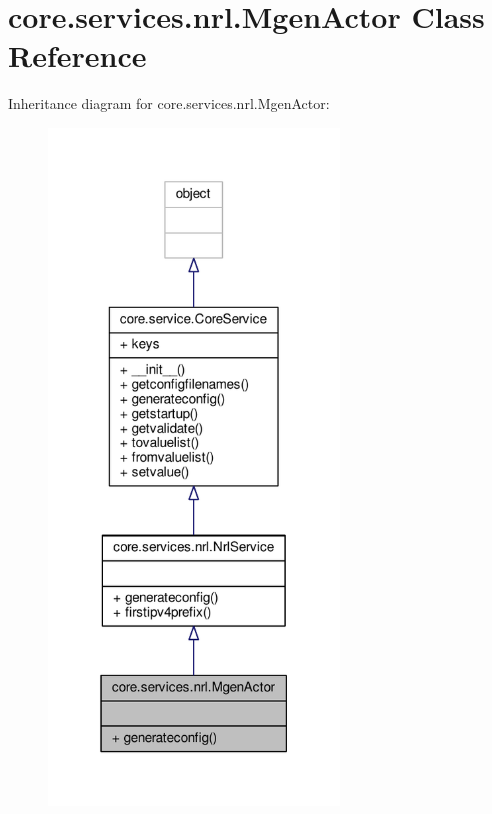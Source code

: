 \hypertarget{classcore_1_1services_1_1nrl_1_1_mgen_actor}{\section{core.\+services.\+nrl.\+Mgen\+Actor Class Reference}
\label{classcore_1_1services_1_1nrl_1_1_mgen_actor}
}


Inheritance diagram for core.\+services.\+nrl.\+Mgen\+Actor\+:
\nopagebreak
\begin{figure}[H]
\begin{center}
\leavevmode
\includegraphics[width=219pt]{classcore_1_1services_1_1nrl_1_1_mgen_actor__inherit__graph}
\end{center}
\end{figure}


